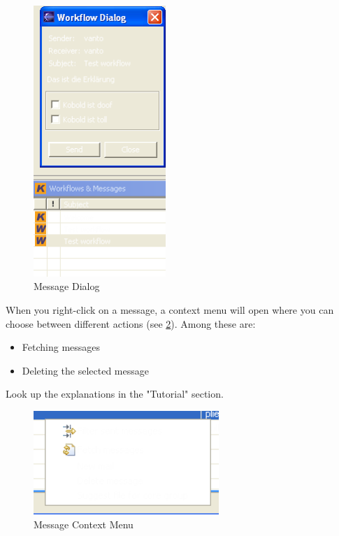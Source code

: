 \begin{figure}[h!]
\begin{center}
\includegraphics[width=5cm]{workflowdialog.png}
   \caption{Message Dialog}
\label{workflowdialog}
\end{center}
\end{figure}\par

When you right-click on a message, a context menu will open where you can choose 
between different actions (see \ref{workflowkontext}). Among these are:

\begin{itemize}
	\item Fetching messages
	\item Deleting the selected message
\end{itemize}
Look up the explanations in the "Tutorial" section.

\begin{figure}[h!]
\begin{center}
\includegraphics[width=7cm]{workflowkontext.png}
   \caption{Message Context Menu}
\label{workflowkontext}
\end{center}
\end{figure}\par

